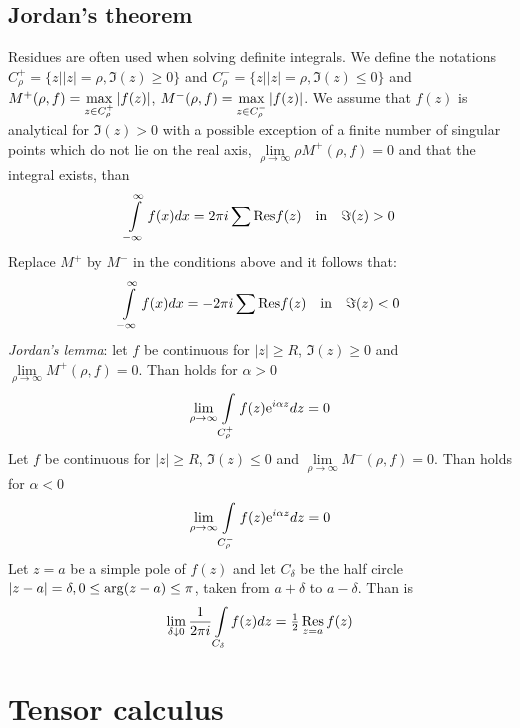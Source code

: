 \documentclass[a4paper,fancyheadings,twoside]{report}
\begin{document}
\section{Jordan's theorem}
Residues are often used when solving definite integrals. We define the notations
$C_\rho^+=\{z||z|=\rho,\Im(z)\geq0\}$ and $C_\rho^-=\{z||z|=\rho,\Im(z)\leq0\}$
and $M^+(\rho,f)=\mathop{\rm max}\limits_{z\in C_\rho^+}|f(z)|$,
$M^-(\rho,f)=\mathop{\rm max}\limits_{z\in C_\rho^-}|f(z)|$. We assume that
$f(z)$ is analytical for $\Im(z)>0$ with a possible exception of a finite number
of singular points which do not lie on the real axis,
$\lim\limits_{\rho\rightarrow\infty}\rho M^+(\rho,f)=0$ and that the integral
exists, than
\[
\int\limits_{-\infty}^\infty f(x)dx=2\pi i\sum{\rm Res}f(z)~~~\mbox{in}~~~\Im(z)>0
\]
Replace $M^+$ by $M^-$ in the conditions above and it follows that:
\[
\int\limits_{-\infty}^\infty f(x)dx=-2\pi i\sum{\rm Res}f(z)~~~\mbox{in}~~~\Im(z)<0
\]
{\it Jordan's lemma}: let $f$ be continuous for $|z|\geq R$, $\Im(z)\geq0$ and
$\lim\limits_{\rho\rightarrow\infty}M^+(\rho,f)=0$. Than holds for $\alpha>0$
\[
\lim_{\rho\rightarrow\infty}\int\limits_{C_\rho^+}f(z){\rm e}^{i\alpha z}dz=0
\]
Let $f$ be continuous for $|z|\geq R$, $\Im(z)\leq0$ and
$\lim\limits_{\rho\rightarrow\infty}M^-(\rho,f)=0$. Than holds for $\alpha<0$
\[
\lim_{\rho\rightarrow\infty}\int\limits_{C_\rho^-}f(z){\rm e}^{i\alpha z}dz=0
\]
Let $z=a$ be a simple pole of $f(z)$ and let $C_\delta$ be the half circle
$|z-a|=\delta,0\leq{\rm arg}(z-a)\leq\pi$, taken from $a+\delta$ to
$a-\delta$. Than is
\[
\lim_{\delta\downarrow0}\frac{1}{2\pi i}\int\limits_{C_\delta}f(z)dz=\mbox{$\frac{1}{2}$}\mathop{\rm Res}\limits_{z=a}f(z)
\]


\chapter{Tensor calculus}
\end{document}
